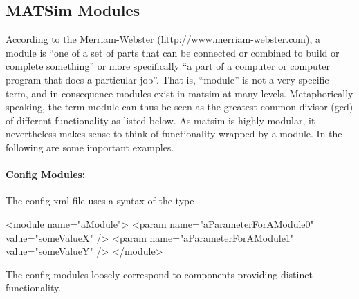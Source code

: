 \subsection{MATSim Modules}
According to the Merriam-Webster (\url{http://www.merriam-webster.com}), a module is
%
``one of a set of parts that can be connected or combined to build or complete something'' 
%
or more specifically
%
``a part of a computer or computer program that does a particular job''. 
%
That is, ``module'' is not a very specific term, and in consequence modules exist in \gls{matsim} at many levels. Metaphorically speaking, the term module can thus be seen as the greatest common divisor (gcd) of different functionality as listed below.
%
As \gls{matsim} is 
highly modular, it nevertheless makes sense to think of functionality wrapped by a module. In the following are some important examples.




\paragraph{Config Modules:} The config \gls{xml} file uses a syntax of the type
\begin{xml}
<module name="aModule">
    <param name="aParameterForAModule0" value="someValueX" />
    <param name="aParameterForAModule1" value="someValueY" />
</module>
\end{xml}
The config modules loosely correspond to components providing distinct functionality. 


